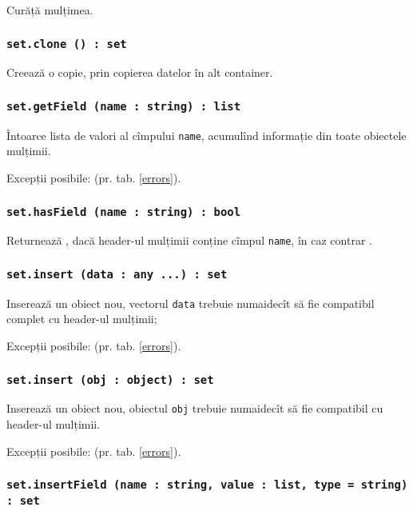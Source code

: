 Curăță mulțimea.

\subsubsection{\texttt{set.clone () : set}}

Creează o copie, prin copierea datelor în alt container.

\subsubsection{\texttt{set.getField (name : string) : list}}

Întoarce lista de valori al cîmpului \texttt{name}, acumulînd informație din toate obiectele mulțimii.

Excepții posibile:  (pr. tab. \ref{errors}).

\subsubsection{\texttt{set.hasField (name : string) : bool}}

Returnează \true, dacă header-ul mulțimii conține cîmpul \texttt{name}, în caz contrar \false.

\subsubsection{\texttt{set.insert (data : any ...) : set}}

Inserează un obiect nou, vectorul \texttt{data} trebuie numaidecît să fie compatibil complet cu header-ul mulțimii;

Excepții posibile:  (pr. tab. \ref{errors}).

\subsubsection{\texttt{set.insert (obj : object) : set}}

Inserează un obiect nou, obiectul \texttt{obj} trebuie numaidecît să fie compatibil cu header-ul mulțimii.

Excepții posibile:  (pr. tab. \ref{errors}).

\subsubsection{\texttt{set.insertField (name : string, value : list, type = string) : set}}

